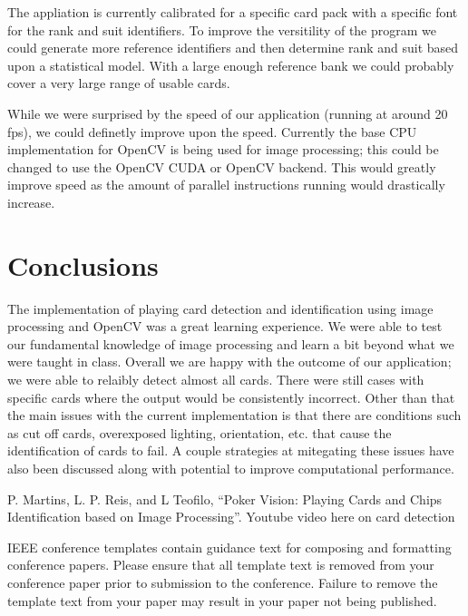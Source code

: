 \documentclass[conference]{IEEEtran}
\begin{document}
The appliation is currently calibrated for a specific card pack with a specific font for the rank
and suit identifiers. To improve the versitility of the program we could generate more reference
identifiers and then determine rank and suit based upon a statistical model. With a large enough
reference bank we could probably cover a very large range of usable cards.

While we were surprised by the speed of our application (running at around 20 fps), we could
definetly improve upon the speed. Currently the base CPU implementation for OpenCV is being used for
image processing; this could be changed to use the OpenCV CUDA or OpenCV backend. This would greatly
improve speed as the amount of parallel instructions running would drastically increase.

\section{Conclusions}
The implementation of playing card detection and identification using image processing and OpenCV
was a great learning experience. We were able to test our fundamental knowledge of image processing
and learn a bit beyond what we were taught in class. Overall we are happy with the outcome of our
application; we were able to relaibly detect almost all cards. There were still cases with specific
cards where the output would be consistently incorrect. Other than that the main issues with the
current implementation is that there are conditions such as cut off cards, overexposed lighting,
orientation, etc. that cause the identification of cards to fail. A couple strategies at mitegating
these issues have also been discussed along with potential to improve computational performance.

\begin{thebibliography}{00}
 P. Martins, L. P. Reis, and L Teofilo, ``Poker Vision: Playing Cards and
    Chips Identification based on Image Processing''.
 Youtube video here on card detection
\end{thebibliography}
\vspace{12pt}
\color{red}
IEEE conference templates contain guidance text for composing and formatting conference papers. Please ensure that all template text is removed from your conference paper prior to submission to the conference. Failure to remove the template text from your paper may result in your paper not being published.
\end{document}
